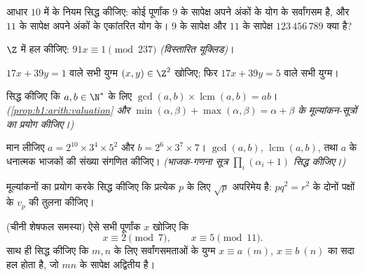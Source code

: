 \begin{exercise}[$\star$]\label{exo:b1:arith:2}
आधार $10$ में  के नियम सिद्ध कीजिए: कोई पूर्णांक $9$ के सापेक्ष
अपने अंकों के योग के सर्वांगसम है, और $11$ के सापेक्ष अपने अंकों के एकांतरित
योग के। $9$ के सापेक्ष और $11$ के सापेक्ष $123\,456\,789$ क्या है?
\end{exercise}

\begin{exercise}[$\star$]\label{exo:b1:arith:3}
$\Z$ में हल कीजिए: $91x \equiv 1 \pmod{237}$ \emph{(विस्तारित यूक्लिड)}।
\end{exercise}

\begin{exercise}[$\star$]\label{exo:b1:arith:4}
$17x + 39y = 1$ वाले सभी युग्म $(x, y) \in \Z^2$ खोजिए; फिर $17 x + 39 y =
5$ वाले सभी युग्म।
\end{exercise}

\begin{exercise}[$\star\star$]\label{exo:b1:arith:5}
सिद्ध कीजिए कि $a, b \in \N^*$ के लिए $\gcd(a,b) \times
\operatorname{lcm}(a,b) = ab$। \emph{(\cref{prop:b1:arith:valuation} और
$\min(\alpha,\beta) + \max(\alpha,\beta) = \alpha + \beta$ के
मूल्यांकन-सूत्रों का प्रयोग कीजिए।)}
\end{exercise}

\begin{exercise}[$\star\star$]\label{exo:b1:arith:6}
मान लीजिए $a = 2^{10} \times 3^4 \times 5^2$ और $b = 2^6 \times 3^7 \times
7$। $\gcd(a, b)$, $\operatorname{lcm}(a,b)$, तथा $a$ के धनात्मक भाजकों की
संख्या संगणित कीजिए। \emph{(भाजक-गणना सूत्र $\prod_i (\alpha_i + 1)$ सिद्ध
कीजिए।)}
\end{exercise}

\begin{exercise}[$\star\star$]\label{exo:b1:arith:7}
मूल्यांकनों का प्रयोग करके सिद्ध कीजिए कि प्रत्येक  $p$ के लिए $\sqrt
p$ अपरिमेय है: $p q^2 = r^2$ के दोनों पक्षों के $v_p$ की तुलना कीजिए।
\end{exercise}

\begin{exercise}[$\star\star$]\label{exo:b1:arith:8}
(चीनी शेषफल समस्या) ऐसे सभी पूर्णांक $x$ खोजिए कि
\[
x \equiv 2 \pmod 7, \qquad x \equiv 5 \pmod{11}.
\]
साथ ही सिद्ध कीजिए कि  $m, n$ के लिए सर्वांगसमताओं के युग्म $x
\equiv a \ (m)$, $x \equiv b\ (n)$ का सदा हल होता है, जो $mn$ के सापेक्ष
अद्वितीय है।
\end{exercise}


